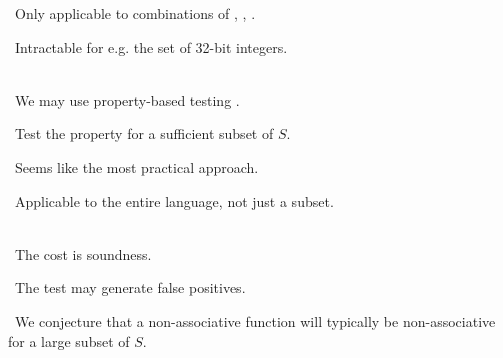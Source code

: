 \begin{frame}[plain]

\bi\ Only applicable to combinations of \LBXOR, \LBAND, \LBOR\footnotemark[3].

\bi\ Intractable for e.g. the set of 32-bit integers.

\ \\

\bi\ We may use property-based testing \cite{quickcheck}.

\bi\ Test the property for a sufficient subset of $S$.

\bi\ Seems like the most practical approach.

\bi\ Applicable to the entire language, not just a subset.

\ \\

\bi\ The cost is soundness.

\bi\ The test may generate false positives.

\bi\ We conjecture that a non-associative function will typically be
non-associative for a large subset of $S$.


\end{frame}
